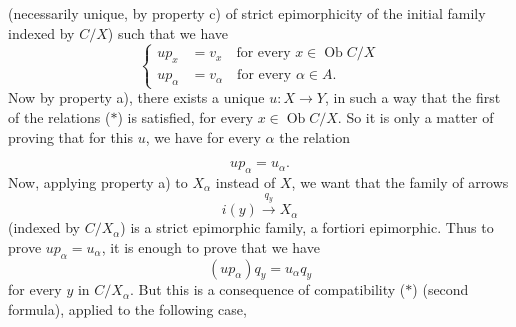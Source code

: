 \documentclass[11pt]{article}
\newcommand{\msp}[1]{\marginpar{\footnotesize [#1]}}
\newcommand{\Ob}{\operatorname{Ob}}
\begin{document}
(necessarily unique, by property c) of strict epimorphicity of the initial family indexed by $C/X$) such that we have
\[ \left\{\begin{aligned}
up_x &= v_x \quad \text{for every } x \in \Ob C/X\\ %
up_\alpha &= v_\alpha \quad \text{for every } \alpha \in A. %
\end{aligned}\right. \tag*{($*$)} \]
Now by property a), there exists a unique $u : X \longrightarrow Y$, in such a way that the first of the relations ($*$) is satisfied, for every $x \in \Ob C/X$. So it is only a matter of proving that for this $u$, we have for every $\alpha$ the relation

\msp{page 196}
\[ up_\alpha = u_\alpha . \]
Now, applying property a) to $X_\alpha$ instead of $X$, we want that the family of arrows %
\[ i(y) \xrightarrow{q_y} X_\alpha \]
(indexed by $C/X_\alpha$) is a strict epimorphic family, a fortiori epimorphic. Thus to prove $up_\alpha = u_\alpha$, it is enough to prove that we have
\[ (up_\alpha)q_y = u_\alpha q_y \tag*{($**$)} \]
for every $y$ in $C/X_\alpha$. But this is a consequence of compatibility ($*$) (second formula), applied to the following case,
\end{document}
